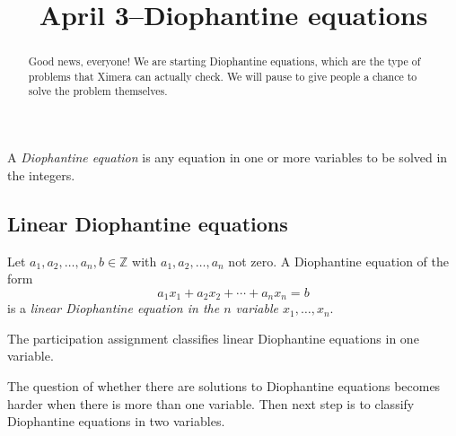 \documentclass{ximera}
\title{April 3--Diophantine equations}
\begin{document}
  
\begin{abstract}  
Good news, everyone! We are starting Diophantine equations, which are the type of problems that Ximera can actually check. We will pause to give people a chance to solve the problem themselves.\end{abstract}  
\maketitle  

\begin{definition}
 A \emph{Diophantine equation} is any equation in one or more variables to be solved in the integers.
\end{definition}

\subsection{Linear Diophantine equations}

\begin{definition}
 Let $a_1,a_2,\dots,a_n,b\in\mathbb{Z}$ with $a_1,a_2,\dots,a_n$ not zero. A Diophantine equation of the form \[a_1x_1+a_2x_2+\cdots+a_nx_n=b\] is a \emph{linear Diophantine equation in the $n$ variable $x_1,\dots,x_n$}.
\end{definition}

The participation assignment classifies linear Diophantine equations in one variable.

The question of whether there are solutions to Diophantine equations becomes harder when there is more than one variable. Then next step is to classify Diophantine equations in two variables.
\end{document}
